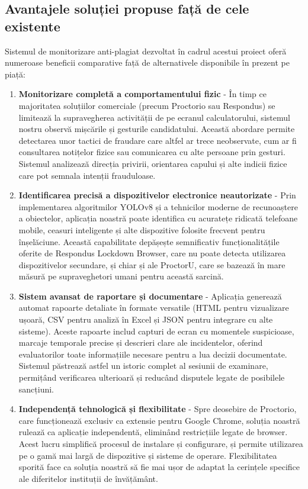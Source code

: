 \documentclass[12pt,a4paper]{article}
\begin{document}
\subsection{Avantajele soluției propuse față de cele existente}

Sistemul de monitorizare anti-plagiat dezvoltat în cadrul acestui proiect oferă numeroase beneficii comparative față de alternativele disponibile în prezent pe piață:

\begin{enumerate}
    \item \textbf{Monitorizare completă a comportamentului fizic} - În timp ce majoritatea soluțiilor comerciale (precum Proctorio sau Respondus) se limitează la supravegherea activității de pe ecranul calculatorului, sistemul nostru observă mișcările și gesturile candidatului. Această abordare permite detectarea unor tactici de fraudare care altfel ar trece neobservate, cum ar fi consultarea notițelor fizice sau comunicarea cu alte persoane prin gesturi. Sistemul analizează direcția privirii, orientarea capului și alte indicii fizice care pot semnala intenții frauduloase.
    
    \item \textbf{Identificarea precisă a dispozitivelor electronice neautorizate} - Prin implementarea algoritmilor YOLOv8 și a tehnicilor moderne de recunoaștere a obiectelor, aplicația noastră poate identifica cu acuratețe ridicată telefoane mobile, ceasuri inteligente și alte dispozitive folosite frecvent pentru înșelăciune. Această capabilitate depășește semnificativ funcționalitățile oferite de Respondus Lockdown Browser, care nu poate detecta utilizarea dispozitivelor secundare, și chiar și ale ProctorU, care se bazează în mare măsură pe supraveghetori umani pentru această sarcină.
    
    \item \textbf{Sistem avansat de raportare și documentare} - Aplicația generează automat rapoarte detaliate în formate versatile (HTML pentru vizualizare ușoară, CSV pentru analiză în Excel și JSON pentru integrare cu alte sisteme). Aceste rapoarte includ capturi de ecran cu momentele suspicioase, marcaje temporale precise și descrieri clare ale incidentelor, oferind evaluatorilor toate informațiile necesare pentru a lua decizii documentate. Sistemul păstrează astfel un istoric complet al sesiunii de examinare, permițând verificarea ulterioară și reducând disputele legate de posibilele sancțiuni.
    
    \item \textbf{Independență tehnologică și flexibilitate} - Spre deosebire de Proctorio, care funcționează exclusiv ca extensie pentru Google Chrome, soluția noastră rulează ca aplicație independentă, eliminând restricțiile legate de browser. Acest lucru simplifică procesul de instalare și configurare, și permite utilizarea pe o gamă mai largă de dispozitive și sisteme de operare. Flexibilitatea sporită face ca soluția noastră să fie mai ușor de adaptat la cerințele specifice ale diferitelor instituții de învățământ.
    

\end{enumerate}
\end{document}
